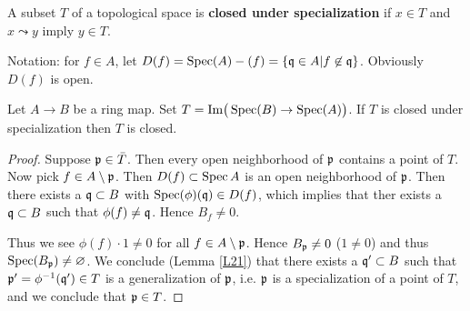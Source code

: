 \documentclass{../mathnotes}
\begin{document}
\begin{defn}
A subset $T$ of a topological space is \textbf{closed under specialization} if $x\in T$ and $x \leadsto y$ imply $y\in T$.
\end{defn}

Notation: for $f\in A$, let $D(f) = \operatorname{Spec}(A) - (f) = \{\mathfrak q \in A | f\not \in \mathfrak q\}$. Obviously $D(f)$ is open.

\begin{lem}
\label{L22}
Let $A \to B$ be a ring map. Set $T = \text{Im} \big(\operatorname{Spec}(B) \to \operatorname{Spec}(A) \big)$. If $T$ is closed under specialization then $T$ is closed.
\end{lem}
\begin{proof}
Suppose $\mathfrak p\in\bar T$. Then every open neighborhood of $\mathfrak p$ contains a point of $T$. Now pick $f\in A\setminus{\mathfrak p}$. Then $D(f)\subset\operatorname{Spec} A$ is an open neighborhood of $\mathfrak p$. Then there exists a $\mathfrak q\subset B$ with $\operatorname{Spec}(\phi)(\mathfrak q)\in D(f)$, which implies that ther exists a $\mathfrak q\subset B$ such that $\phi(f)\neq\mathfrak q$. Hence $B_f\neq 0$.

Thus we see $\phi(f)\cdot 1\neq 0$ for all $f\in A\setminus\mathfrak p$. Hence $B_\mathfrak p\neq 0$ ($1\neq 0$) and thus $\operatorname{Spec}(B_\mathfrak p)\neq\varnothing$. We conclude (Lemma \ref{L21}) that there exists a $\mathfrak q'\subset B$ such that $\mathfrak p'=\phi^{-1}(\mathfrak q')\in T$ is a generalization of $\mathfrak p$, i.e. $\mathfrak p$ is a specialization of a point of $T$, and we conclude that $\mathfrak p\in T$.
\end{proof}
\end{document}

